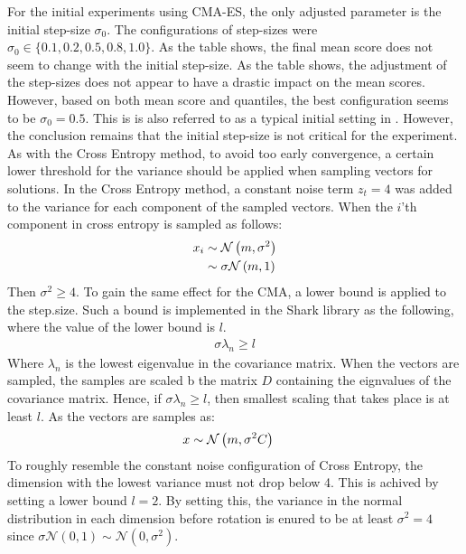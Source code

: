 For the initial experiments using CMA-ES, 
the only adjusted parameter is the initial 
step-size $\sigma_0$. The configurations of step-sizes were 
$\sigma_0 \in \{0.1, 0.2, 0.5, 0.8, 1.0\}$. As the table shows,
the final mean score does not seem to change with the initial step-size.
As the table shows, the adjustment of the step-sizes does not appear to 
have a drastic impact on the mean scores. However, based on both mean score and
quantiles, the best configuration seems to be $\sigma_0 = 0.5$. This is 
is also referred to as a typical initial setting in \citep{boumaza2009}.
However, the conclusion remains that the initial step-size is not critical 
for the experiment.\\

As with the Cross Entropy method, to avoid too early convergence, a 
certain lower threshold for the variance should be applied when 
sampling vectors for solutions. In the Cross Entropy method, a constant 
noise term $z_t = 4$ was added to the variance for each component
of the sampled vectors. When the $i$'th component in cross entropy is
sampled as follows:
\begin{align*}
x_i &\sim \mathcal{N}\left(m, \sigma^{2}\right)\\
              &\sim \sigma \mathcal{N}\left(m, 1\right)
\end{align*}
Then $\sigma^{2} \geq 4$. To gain the same effect for the CMA, a lower bound 
is applied to the step.size. Such a bound is implemented in the Shark library
as the following, where the value of the lower bound is $l$.
\begin{align*}
\sigma  \lambda_n \geq l
\end{align*}
Where $\lambda_n$ is the lowest eigenvalue in the covariance matrix. 
When the vectors are sampled, the samples are scaled b the matrix $D$
containing the eignvalues of the covariance matrix. 
Hence, if $\sigma \lambda_n \geq l$, then smallest scaling
that takes place is at least $l$. As the vectors are samples
as: 
\begin{align*}
x &\sim \mathcal{N}\left( m, \sigma^{2}C \right)
\end{align*}
To roughly resemble the constant noise configuration of Cross Entropy,
the dimension with the lowest variance must not drop below 4. 
This is achived by setting a lower bound $l=2$. By setting this, 
the variance in the normal distribution in each dimension 
before rotation is enured to be at least $\sigma^{2} = 4$
since $\sigma \mathcal{N}\left( 0, 1 \right) \sim 
\mathcal{N}\left( 0, \sigma^{2} \right)$.


